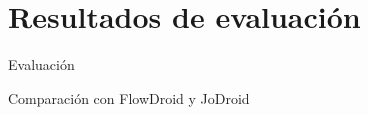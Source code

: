  \section{Resultados de evaluación}
	
\begin{frame}{Evaluación}
	\begin{block}{}
	Comparación con FlowDroid y JoDroid
	\end{block}
\end{frame}